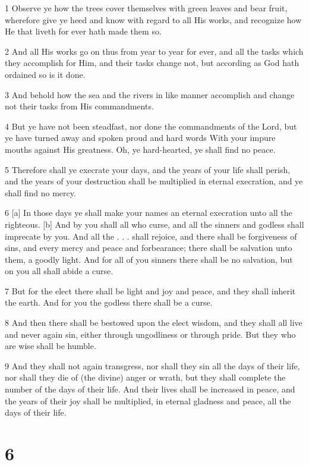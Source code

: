 \par 1 Observe ye how the trees cover themselves with green leaves and bear fruit, wherefore give ye heed and know with regard to all His works, and recognize how He that liveth for ever hath made them so.
\par 2 And all His works go on thus from year to year for ever, and all the tasks which they accomplish for Him, and their tasks change not, but according as God hath ordained so is it done.
\par 3 And behold how the sea and the rivers in like manner accomplish and change not their tasks from His commandments.
\par 4 But ye have not been steadfast, nor done the commandments of the Lord, but ye have turned away and spoken proud and hard words With your impure mouths against His greatness. Oh, ye hard-hearted, ye shall find no peace.
\par 5 Therefore shall ye execrate your days, and the years of your life shall perish, and the years of your destruction shall be multiplied in eternal execration, and ye shall find no mercy.
\par 6 [a] In those days ye shall make your names an eternal execration unto all the righteous. [b] And by you shall all who curse, and all the sinners and godless shall imprecate by you. And all the . . . shall rejoice, and there shall be forgiveness of sins, and every mercy and peace and forbearance; there shall be salvation unto them, a goodly light. And for all of you sinners there shall be no salvation, but on you all shall abide a curse.
\par 7 But for the elect there shall be light and joy and peace, and they shall inherit the earth. And for you the godless there shall be a curse.
\par 8 And then there shall be bestowed upon the elect wisdom, and they shall all live and never again sin, either through ungodliness or through pride. But they who are wise shall be humble.
\par 9 And they shall not again transgress, nor shall they sin all the days of their life, nor shall they die of (the divine) anger or wrath, but they shall complete the number of the days of their life. And their lives shall be increased in peace, and the years of their joy shall be multiplied, in eternal gladness and peace, all the days of their life.

\chapter{6}

